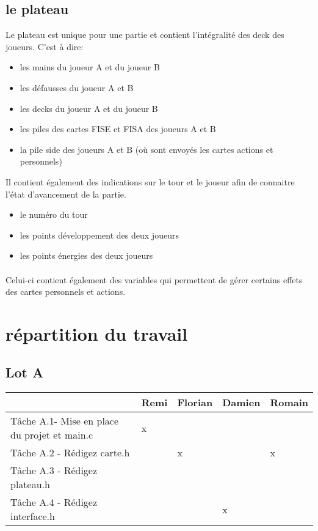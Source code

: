\documentclass[12pt]{article}
\begin{document}
\subsection{le plateau}

Le plateau est unique pour une partie et contient l'intégralité des deck des joueurs. C'est à dire:
\begin{itemize}
	\item les mains du joueur A et du joueur B
	\item les défausses du joueur A et B
	\item les decks du joueur A et du joueur B
	\item les piles des cartes FISE et FISA des joueurs A et B
	\item la pile side des joueurs A et B (où sont envoyés les cartes actions et personnels)
\end{itemize} 
Il contient également des indications sur le tour et le joueur afin de connaitre l'état d'avancement de la partie.
\begin{itemize}
\item le numéro du tour
\item les points développement des deux joueurs
\item les points énergies des deux joueurs 	
\end{itemize}


\paragraph{}
Celui-ci contient également des variables qui permettent de gérer certains effets des cartes personnels et actions.

\section{répartition du travail}

\subsection{Lot A}
\begin{tabular}{|p{8cm}|p{1.3cm}|p{1.3cm}|p{1.4cm}|p{1.6cm}|}
\hline
& Remi  & Florian  &  Damien &  Romain \\
\hline
Tâche A.1- Mise en place du projet et main.c & x& & & \\
\hline
Tâche A.2 - Rédigez carte.h&  &x  & &x  \\
\hline
Tâche A.3 - Rédigez plateau.h & & &  &  \\
\hline
Tâche A.4 - Rédigez interface.h
 &&&  x&\\
\hline
\end{tabular}
\end{document}
